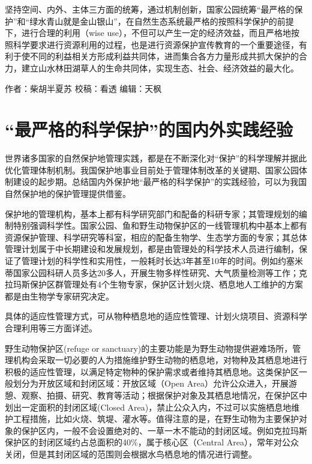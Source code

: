 \documentclass[]{book}
\begin{document}
坚持空间、内外、主体三方面的统筹，通过机制创新，国家公园统筹``最严格的保护''和``绿水青山就是金山银山''，在自然生态系统最严格的按照科学保护的前提下，进行合理的利用（wise use），不但可以产生一定的经济效益，而且严格地按照科学要求进行资源利用的过程，也是进行资源保护宣传教育的一个重要途径，有利于使不同的利益相关方形成利益共同体，进而集合各方力量形成共抓大保护的合力，建立山水林田湖草人的生命共同体，实现生态、社会、经济效益的最大化。

作者：柴胡半夏苏
校稿：看透
编辑：天枫

\hypertarget{ux6700ux4e25ux683cux7684ux79d1ux5b66ux4fddux62a4ux7684ux56fdux5185ux5916ux5b9eux8df5ux7ecfux9a8c}{%
\section{``最严格的科学保护''的国内外实践经验}\label{ux6700ux4e25ux683cux7684ux79d1ux5b66ux4fddux62a4ux7684ux56fdux5185ux5916ux5b9eux8df5ux7ecfux9a8c}}

世界诸多国家的自然保护地管理实践，都是在不断深化对``保护''的科学理解并据此优化管理体制机制。我国保护地事业目前处于管理体制改革的关键期、国家公园体制建设的起步期。总结国内外保护地``最严格的科学保护''的实践经验，可以为我国自然保护地的保护管理提供借鉴。

保护地的管理机构，基本上都有科学研究部门和配备的科研专家；其管理规划的编制特别强调科学性。国家公园、鱼和野生动物保护区的一线管理机构中基本上都有资源保护管理、科学研究等科室，相应的配备生物学、生态学方面的专家；其总体管理计划属于中长期建设和发展规划，都是由管理处的科学技术人员进行编制，保证了管理计划的科学性和实用性，一般耗时长达3年甚至10年的时间。例如约塞米蒂国家公园科研人员多达20多人，开展生物多样性研究、大气质量检测等工作；克拉玛斯保护区群管理处有4个生物专家，保护区计划火烧、栖息地人工维护的方案都是由生物学专家研究决定。

具体的适应性管理方式，可从物种栖息地的适应性管理、计划火烧项目、资源科学合理利用等三方面详述。

野生动物保护区(refuge or sanctuary)的主要功能是为野生动物提供避难场所，管理机构会采取一切必要的人为措施维护野生动物的栖息地，对物种及其栖息地进行积极的适应性管理，以满足特定物种的保护需求或者维持其栖息地。这类保护区一般划分为开放区域和封闭区域：开放区域（Open Area）允许公众进入，开展游憩、观察、拍摄、研究、教育等活动；根据保护对象及其栖息地情况，在保护区中划出一定面积的封闭区域(Closed Area)，禁止公众入内，不过可以实施栖息地维护工程措施，比如火烧、筑堤、灌水等。值得注意的是，在野生动物为主要保护对象的保护区内，一般不会设置绝对的、一草一木不能动的封闭区域。例如克拉玛斯保护区的封闭区域约占总面积的40\%，属于核心区（Central Area），常年对公众关闭，但是其封闭区域的范围则会根据水鸟栖息地的情况进行调整。
\end{document}
